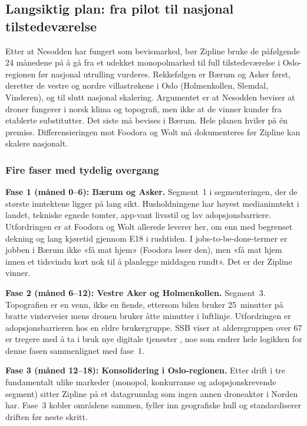 \subsection{Langsiktig plan: fra pilot til nasjonal tilstedeværelse}

Etter at Nesodden har fungert som bevismarked, bør Zipline bruke de
påfølgende 24 månedene på å gå fra et udekket monopolmarked til full
tilstedeværelse i Oslo-regionen før nasjonal utrulling vurderes.
Rekkefølgen er Bærum og Asker først, deretter de vestre og nordre
villastrøkene i Oslo (Holmenkollen, Slemdal, Vinderen), og til slutt
nasjonal skalering. Argumentet er at Nesodden beviser at droner fungerer i
norsk klima og topografi, men ikke at de vinner kunder fra etablerte
substitutter. Det siste må bevises i Bærum. Hele planen hviler på én
premiss. Differensieringen mot Foodora og Wolt må dokumenteres før
Zipline kan skalere nasjonalt.

\subsubsection{Fire faser med tydelig overgang}

\textbf{Fase 1 (måned 0--6): Bærum og Asker.}
Segment~1 i segmenteringen, der de største inntektene ligger på lang
sikt. Husholdningene har høyest medianinntekt i landet, tekniske egnede
tomter, app-vant livsstil og lav adopsjonsbarriere. Utfordringen er at Foodora og Wolt allerede
leverer her, om enn med begrenset dekning og lang kjøretid gjennom E18 i
rushtiden. I jobs-to-be-done-termer \parencite{christensen2016} er jobben i
Bærum ikke «få mat hjem» (Foodora løser den), men «få mat hjem innen
et tidsvindu kort nok til å planlegge middagen rundt». Det er der Zipline
vinner.

\textbf{Fase 2 (måned 6--12): Vestre Aker og Holmenkollen.}
Segment~3. Topografien er en venn, ikke en fiende, ettersom bilen bruker
25~minutter på bratte vinterveier mens dronen bruker åtte minutter i
luftlinje. Utfordringen er adopsjonsbarrieren hos en eldre brukergruppe.
SSB viser at aldersgruppen over 67 er tregere med å ta i bruk nye digitale
tjenester \parencite{ssb2023}, noe som endrer hele logikken for denne
fasen sammenlignet med fase~1.

\textbf{Fase 3 (måned 12--18): Konsolidering i Oslo-regionen.}
Etter drift i tre fundamentalt ulike markeder (monopol, konkurranse og
adopsjonskrevende segment) sitter Zipline på et datagrunnlag som ingen
annen droneaktør i Norden har. Fase~3 kobler områdene sammen, fyller inn
geografiske hull og standardiserer driften før neste skritt.


